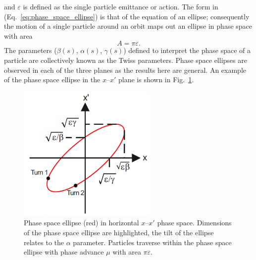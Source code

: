 \documentclass[../main.tex]{subfiles}
\begin{document}
and $\varepsilon$ is defined as the single particle emittance or action. The form in (Eq.~\ref{eq:phase_space_ellipse}) is that of the equation of an ellipse; consequently the motion of a single particle around an orbit maps out an ellipse in phase space with area
\begin{equation}
A=\pi\varepsilon.
\label{eq:phase_space_area}    
\end{equation}
The parameters ($\beta\left(s\right)$, $\alpha\left(s\right)$, $\gamma\left(s\right)$) defined to interpret the phase space of a particle are collectively known as the Twiss parameters. Phase space ellipses are observed in each of the three planes as the results here are general. An example of the phase space ellipse in the $x$--$x'$ plane is shown in Fig.~\ref{fig:phase_space_diagram}.

\begin{figure}[!h]
\centering
\includegraphics[width=0.6\textwidth]{Figures/Energy_Recovery_Linac_Design/phase_space_fixed.pdf}
\caption{Phase space ellipse (red) in horizontal $x$--$x'$ phase space. Dimensions of the phase space ellipse are highlighted, the tilt of the ellipse relates to the $\alpha$ parameter. Particles traverse within the phase space ellipse with phase advance $\mu$ with area $\pi\varepsilon$.}
\label{fig:phase_space_diagram}
\end{figure}
\end{document}
